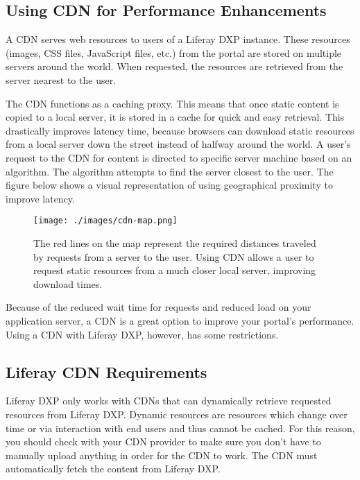 \subsection{Using CDN for Performance
Enhancements}\label{using-cdn-for-performance-enhancements}

A CDN serves web resources to users of a Liferay DXP instance. These
resources (images, CSS files, JavaScript files, etc.) from the portal
are stored on multiple servers around the world. When requested, the
resources are retrieved from the server nearest to the user.

The CDN functions as a caching proxy. This means that once static
content is copied to a local server, it is stored in a cache for quick
and easy retrieval. This drastically improves latency time, because
browsers can download static resources from a local server down the
street instead of halfway around the world. A user's request to the CDN
for content is directed to specific server machine based on an
algorithm. The algorithm attempts to find the server closest to the
user. The figure below shows a visual representation of using
geographical proximity to improve latency.

\begin{figure}
\centering
\texttt{[image: ./images/cdn-map.png]}
\caption{The red lines on the map represent the required distances
traveled by requests from a server to the user. Using CDN allows a user
to request static resources from a much closer local server, improving
download times.}
\end{figure}

Because of the reduced wait time for requests and reduced load on your
application server, a CDN is a great option to improve your portal's
performance. Using a CDN with Liferay DXP, however, has some
restrictions.

\subsection{Liferay CDN Requirements}\label{liferay-cdn-requirements}

Liferay DXP only works with CDNs that can dynamically retrieve requested
resources from Liferay DXP. Dynamic resources are resources which change
over time or via interaction with end users and thus cannot be cached.
For this reason, you should check with your CDN provider to make sure
you don't have to manually upload anything in order for the CDN to work.
The CDN must automatically fetch the content from Liferay DXP.

